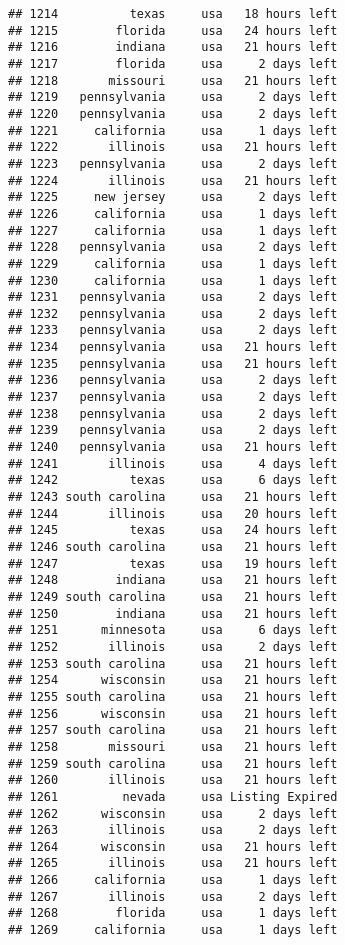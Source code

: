 \documentclass[
]{article}
\begin{document}
\begin{verbatim}
## 1214          texas     usa   18 hours left
## 1215        florida     usa   24 hours left
## 1216        indiana     usa   21 hours left
## 1217        florida     usa     2 days left
## 1218       missouri     usa   21 hours left
## 1219   pennsylvania     usa     2 days left
## 1220   pennsylvania     usa     2 days left
## 1221     california     usa     1 days left
## 1222       illinois     usa   21 hours left
## 1223   pennsylvania     usa     2 days left
## 1224       illinois     usa   21 hours left
## 1225     new jersey     usa     2 days left
## 1226     california     usa     1 days left
## 1227     california     usa     1 days left
## 1228   pennsylvania     usa     2 days left
## 1229     california     usa     1 days left
## 1230     california     usa     1 days left
## 1231   pennsylvania     usa     2 days left
## 1232   pennsylvania     usa     2 days left
## 1233   pennsylvania     usa     2 days left
## 1234   pennsylvania     usa   21 hours left
## 1235   pennsylvania     usa   21 hours left
## 1236   pennsylvania     usa     2 days left
## 1237   pennsylvania     usa     2 days left
## 1238   pennsylvania     usa     2 days left
## 1239   pennsylvania     usa     2 days left
## 1240   pennsylvania     usa   21 hours left
## 1241       illinois     usa     4 days left
## 1242          texas     usa     6 days left
## 1243 south carolina     usa   21 hours left
## 1244       illinois     usa   20 hours left
## 1245          texas     usa   24 hours left
## 1246 south carolina     usa   21 hours left
## 1247          texas     usa   19 hours left
## 1248        indiana     usa   21 hours left
## 1249 south carolina     usa   21 hours left
## 1250        indiana     usa   21 hours left
## 1251      minnesota     usa     6 days left
## 1252       illinois     usa     2 days left
## 1253 south carolina     usa   21 hours left
## 1254      wisconsin     usa   21 hours left
## 1255 south carolina     usa   21 hours left
## 1256      wisconsin     usa   21 hours left
## 1257 south carolina     usa   21 hours left
## 1258       missouri     usa   21 hours left
## 1259 south carolina     usa   21 hours left
## 1260       illinois     usa   21 hours left
## 1261         nevada     usa Listing Expired
## 1262      wisconsin     usa     2 days left
## 1263       illinois     usa     2 days left
## 1264      wisconsin     usa   21 hours left
## 1265       illinois     usa   21 hours left
## 1266     california     usa     1 days left
## 1267       illinois     usa     2 days left
## 1268        florida     usa     1 days left
## 1269     california     usa     1 days left

\end{verbatim}
\end{document}

